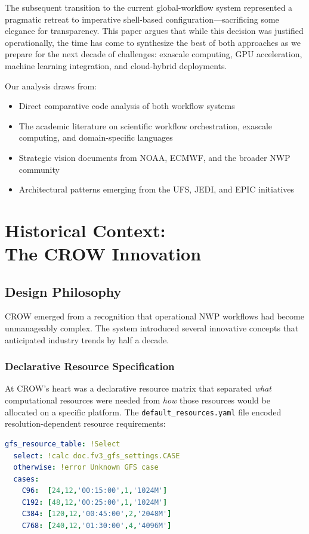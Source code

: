 \documentclass[11pt,twocolumn]{article}
\begin{document}
The subsequent transition to the current global-workflow system represented a pragmatic retreat to imperative shell-based configuration---sacrificing some elegance for transparency. This paper argues that while this decision was justified operationally, the time has come to synthesize the best of both approaches as we prepare for the next decade of challenges: exascale computing, GPU acceleration, machine learning integration, and cloud-hybrid deployments.

Our analysis draws from:
\begin{itemize}
    \item Direct comparative code analysis of both workflow systems
    \item The academic literature on scientific workflow orchestration, exascale computing, and domain-specific languages
    \item Strategic vision documents from NOAA, ECMWF, and the broader NWP community
    \item Architectural patterns emerging from the UFS, JEDI, and EPIC initiatives
\end{itemize}

\section{Historical Context:\\ The CROW Innovation}

\subsection{Design Philosophy}

CROW emerged from a recognition that operational NWP workflows had become unmanageably complex. The system introduced several innovative concepts that anticipated industry trends by half a decade.

\subsubsection{Declarative Resource Specification}

At CROW's heart was a declarative resource matrix that separated \textit{what} computational resources were needed from \textit{how} those resources would be allocated on a specific platform. The \texttt{default\_resources.yaml} file encoded resolution-dependent resource requirements:

\begin{lstlisting}[language=YAML, caption={CROW Resource Matrix Pattern}]
gfs_resource_table: !Select
  select: !calc doc.fv3_gfs_settings.CASE
  otherwise: !error Unknown GFS case
  cases:
    C96:  [24,12,'00:15:00',1,'1024M']
    C192: [48,12,'00:25:00',1,'1024M']
    C384: [120,12,'00:45:00',2,'2048M']
    C768: [240,12,'01:30:00',4,'4096M']
\end{lstlisting}
\end{document}
